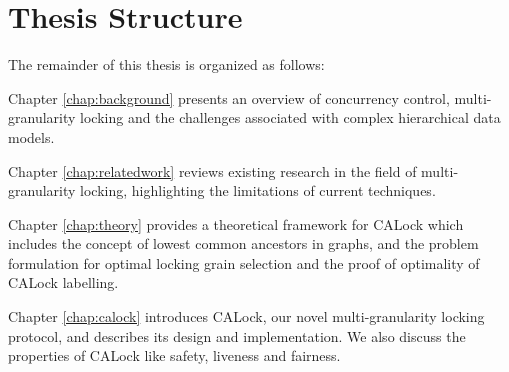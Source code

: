 





\section{Thesis Structure}
The remainder of this thesis is organized as follows:

 Chapter \ref{chap:background} presents an overview of concurrency control, multi-granularity locking and the challenges associated with complex hierarchical data models. 

 Chapter \ref{chap:relatedwork} reviews existing research in the field of multi-granularity locking, highlighting the limitations of current techniques. 

 Chapter \ref{chap:theory} provides a theoretical framework for CALock which includes the concept of lowest common ancestors in graphs, and the problem formulation for optimal locking grain selection and the proof of optimality of CALock labelling.

 Chapter \ref{chap:calock} introduces CALock, our novel multi-granularity locking protocol, and describes its design and implementation. We also discuss the properties of CALock like safety, liveness and fairness.

